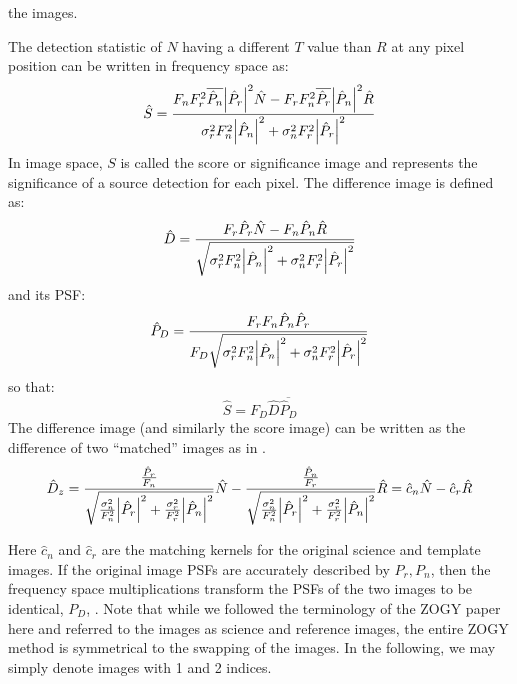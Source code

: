 the images.
%
\par The detection statistic of \(N\) having a different \(T\) value than \(R\)
at any pixel position can be written in frequency space as:
\begin{equation}
  \hat{S} = \frac{F_nF_r^2\overline{\hat{P}_n}\abs{\hat{P}_r}^2 \hat{N}
 - F_rF_n^2\overline{\hat{P}_r}\abs{\hat{P}_n}^2 \hat{R}
}
{ \sigma_r^2F_n^2\abs{\hat{P}_n}^2 + \sigma_n^2F_r^2\abs{\hat{P}_r}^2 }
\label{eq:S}
\end{equation}
In image space, \(S\) is called the score or significance image and
represents the significance of a source detection for each pixel.
%
The difference image is defined as:
\begin{equation}
\hat{D} = \frac{F_r \hat{P}_r\hat{N} - F_n \hat{P}_n \hat{R}}
{\sqrt{\sigma_r^2F_n^2\abs{\hat{P}_n}^2 + \sigma_n^2F_r^2\abs{\hat{P}_r}^2}}
\label{eq:Dhat}
\end{equation}
and its PSF:
\begin{equation}
\hat{P}_D = \frac{F_rF_n\hat{P}_n\hat{P}_r}
{F_D\sqrt{\sigma_r^2F_n^2\abs{\hat{P}_n}^2 +
    \sigma_n^2F_r^2\abs{\hat{P}_r}^2}}
\label{eq:Pdhat}
\end{equation}
so that:
\begin{equation}
\hat{S} = F_D\hat{D}\overline{\hat{P}_D}
\label{eq:Shat}
\end{equation}
The difference image (and similarly the score image) can be written as the
difference of two ``matched'' images as in .
\begin{equation}
\hat{D}_z = \frac{\frac{\hat{P}_r}{F_n}}
{\sqrt{\frac{\sigma_n^2}{F_n^2}\abs{\hat{P}_r}^2
 + \frac{\sigma_r^2}{F_r^2}\abs{\hat{P}_n}^2}}
\hat{N} -
\frac{\frac{\hat{P}_n}{F_r}}
{\sqrt{\frac{\sigma_n^2}{F_n^2}\abs{\hat{P}_r}^2
 + \frac{\sigma_r^2}{F_r^2}\abs{\hat{P}_n}^2}}
\hat{R}
=
\hat{c}_n \hat{N} - \hat{c}_r\hat{R}
\label{eq:c1N_c2R}
\end{equation}
%
\par Here \(\hat{c}_n\) and \(\hat{c}_r\) are the matching kernels for
the original science and template images. If the original image PSFs
are accurately described by \(P_r, P_n\), then the frequency space
multiplications transform the PSFs of the two images to be identical,
\(P_D\), . Note that while we followed the terminology
of the ZOGY paper here and referred to the images as science and
reference images, the entire ZOGY method is symmetrical to the swapping
of the images. In the following, we may simply denote images with 1
and 2 indices.
%

